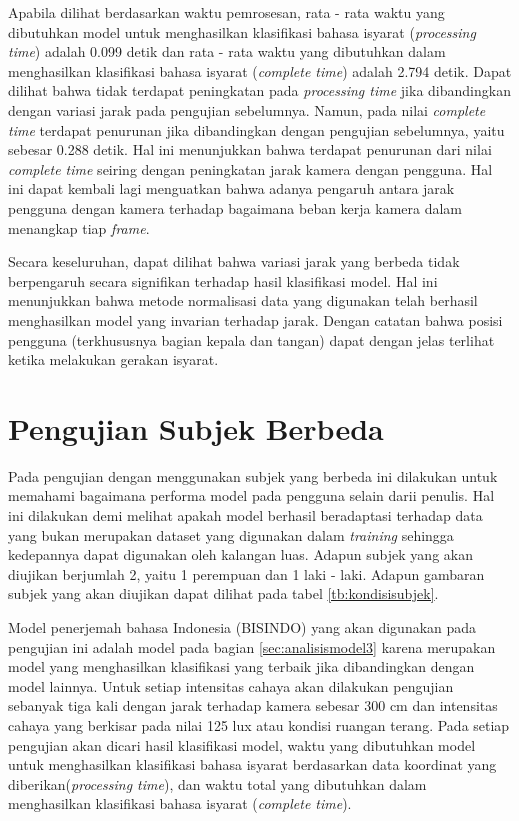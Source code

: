 Apabila dilihat berdasarkan waktu pemrosesan, rata - rata waktu yang dibutuhkan model untuk menghasilkan klasifikasi bahasa isyarat (\emph{processing time}) adalah 0.099 detik dan rata - rata waktu yang dibutuhkan dalam menghasilkan klasifikasi bahasa isyarat (\emph{complete time}) adalah 2.794 detik. Dapat dilihat bahwa tidak terdapat peningkatan pada \emph{processing time} jika dibandingkan dengan variasi jarak pada pengujian sebelumnya. Namun, pada nilai \emph{complete time} terdapat penurunan jika dibandingkan dengan pengujian sebelumnya, yaitu sebesar 0.288 detik. Hal ini menunjukkan bahwa terdapat penurunan dari nilai \emph{complete time} seiring dengan peningkatan jarak kamera dengan pengguna. Hal ini dapat kembali lagi menguatkan bahwa adanya pengaruh antara jarak pengguna dengan kamera terhadap bagaimana beban kerja kamera dalam menangkap tiap \emph{frame}.

Secara keseluruhan, dapat dilihat bahwa variasi jarak yang berbeda tidak berpengaruh secara signifikan terhadap hasil klasifikasi model. Hal ini menunjukkan bahwa metode normalisasi data yang digunakan telah berhasil menghasilkan model yang invarian terhadap jarak. Dengan catatan bahwa posisi pengguna (terkhususnya bagian kepala dan tangan) dapat dengan jelas terlihat ketika melakukan gerakan isyarat.  

\section{Pengujian Subjek Berbeda}
\label{sec:analisissubjek}

Pada pengujian dengan menggunakan subjek yang berbeda ini dilakukan untuk memahami bagaimana performa model pada pengguna selain darii penulis. Hal ini dilakukan demi melihat apakah model berhasil beradaptasi terhadap data yang bukan merupakan dataset yang digunakan dalam \emph{training} sehingga kedepannya dapat digunakan oleh kalangan luas. Adapun subjek yang akan diujikan berjumlah 2, yaitu 1 perempuan dan 1 laki - laki. Adapun gambaran subjek yang akan diujikan dapat dilihat pada tabel \ref{tb:kondisisubjek}. 

Model penerjemah bahasa Indonesia (BISINDO) yang akan digunakan pada pengujian ini adalah model pada bagian \ref{sec:analisismodel3} karena merupakan model yang menghasilkan klasifikasi yang terbaik jika dibandingkan dengan model lainnya. Untuk setiap intensitas cahaya akan dilakukan pengujian sebanyak tiga kali dengan jarak terhadap kamera sebesar 300 cm dan intensitas cahaya yang berkisar pada nilai 125 lux atau kondisi ruangan terang. Pada setiap pengujian akan dicari hasil klasifikasi model, waktu yang dibutuhkan model untuk menghasilkan klasifikasi bahasa isyarat berdasarkan data koordinat yang diberikan(\emph{processing time}), dan waktu total yang dibutuhkan dalam menghasilkan klasifikasi bahasa isyarat (\emph{complete time}).  

